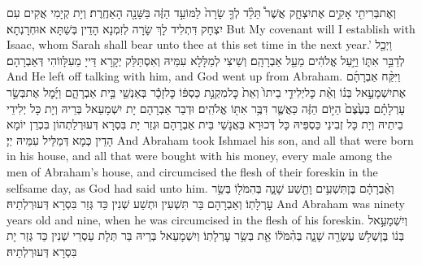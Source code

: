 {וְאֶת\maqqaf בְּרִיתִ֖י אָקִ֣ים אֶת\maqqaf יִצְחָ֑ק אֲשֶׁר֩ תֵּלֵ֨ד לְךָ֤ שָׂרָה֙ לַמּוֹעֵ֣ד הַזֶּ֔ה בַּשָּׁנָ֖ה הָאַחֶֽרֶת׃}
{וְיָת קְיָמִי אֲקִים עִם יִצְחָק דִּתְלִיד לָךְ שָׂרָה לְזִמְנָא הָדֵין בְּשַׁתָּא אוּחְרָנְתָא׃}
{But My covenant will I establish with Isaac, whom Sarah shall bear unto thee at this set time in the next year.’}{}
{וַיְכַ֖ל לְדַבֵּ֣ר אִתּ֑וֹ וַיַּ֣עַל אֱלֹהִ֔ים מֵעַ֖ל אַבְרָהָֽם׃}
{וְשֵׁיצִי לְמַלָּלָא עִמֵּיהּ וְאִסְתַּלַּק יְקָרָא דַּייָ מֵעִלָּווֹהִי דְּאַבְרָהָם׃}
{And He left off talking with him, and God went up from Abraham.}{}
{וַיִּקַּ֨ח אַבְרָהָ֜ם אֶת\maqqaf יִשְׁמָעֵ֣אל בְּנ֗וֹ וְאֵ֨ת כׇּל\maqqaf יְלִידֵ֤י בֵיתוֹ֙ וְאֵת֙ כׇּל\maqqaf מִקְנַ֣ת כַּסְפּ֔וֹ כׇּל\maqqaf זָכָ֕ר בְּאַנְשֵׁ֖י בֵּ֣ית אַבְרָהָ֑ם וַיָּ֜מׇל אֶת\maqqaf בְּשַׂ֣ר עָרְלָתָ֗ם בְּעֶ֙צֶם֙ הַיּ֣וֹם הַזֶּ֔ה כַּאֲשֶׁ֛ר דִּבֶּ֥ר אִתּ֖וֹ אֱלֹהִֽים׃}
{וּדְבַר אַבְרָהָם יָת יִשְׁמָעֵאל בְּרֵיהּ וְיָת כָּל יְלִידֵי בֵיתֵיהּ וְיָת כָּל זְבִינֵי כַּסְפֵּיהּ כָּל דְּכוּרָא בַּאֲנָשֵׁי בֵּית אַבְרָהָם וּגְזַר יָת בִּסְרָא דְּעוּרְלַתְהוֹן בִּכְרַן יוֹמָא הָדֵין כְּמָא דְּמַלֵּיל עִמֵּיהּ יְיָ׃}
{And Abraham took Ishmael his son, and all that were born in his house, and all that were bought with his money, every male among the men of Abraham’s house, and circumcised the flesh of their foreskin in the selfsame day, as God had said unto him.}{}
{וְאַ֨בְרָהָ֔ם בֶּן\maqqaf תִּשְׁעִ֥ים וָתֵ֖שַׁע שָׁנָ֑ה בְּהִמֹּל֖וֹ בְּשַׂ֥ר עׇרְלָתֽוֹ׃}
{וְאַבְרָהָם בַּר תִּשְׁעִין וּתְשַׁע שְׁנִין כַּד גְּזַר בִּסְרָא דְּעוּרְלְתֵיהּ׃}
{And Abraham was ninety years old and nine, when he was circumcised in the flesh of his foreskin.}{}
{וְיִשְׁמָעֵ֣אל בְּנ֔וֹ בֶּן\maqqaf שְׁלֹ֥שׁ עֶשְׂרֵ֖ה שָׁנָ֑ה בְּהִ֨מֹּל֔וֹ אֵ֖ת בְּשַׂ֥ר עׇרְלָתֽוֹ׃}
{וְיִשְׁמָעֵאל בְּרֵיהּ בַּר תְּלָת עַסְרֵי שְׁנִין כַּד גְּזַר יָת בִּסְרָא דְּעוּרְלְתֵיהּ׃}
